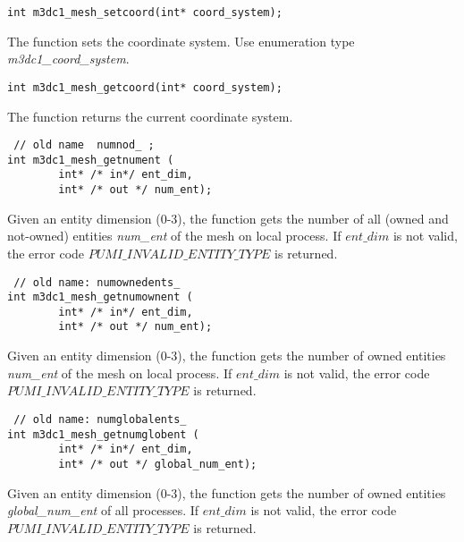 \begin{verbatim}
int m3dc1_mesh_setcoord(int* coord_system);
\end{verbatim}\vspace{-.5cm}\hspace{1cm}

The function sets the coordinate system. Use enumeration type \emph{m3dc1\_coord\_system}.

\begin{verbatim}
int m3dc1_mesh_getcoord(int* coord_system);
\end{verbatim}\vspace{-.5cm}\hspace{1cm}

The function returns the current coordinate system. 


\begin{verbatim}
 // old name  numnod_ ;
int m3dc1_mesh_getnument (
        int* /* in*/ ent_dim, 
        int* /* out */ num_ent);
\end{verbatim}\vspace{-.5cm}\hspace{1cm}

Given an entity dimension (0-3), the function gets the number of all (owned and not-owned) entities \textit{num\_ent} of the mesh on local process.
If $ent\_dim$ is not valid, the error code $PUMI\_INVALID\_ENTITY\_TYPE$ is returned.

\begin{verbatim}
 // old name: numownedents_
int m3dc1_mesh_getnumownent (
        int* /* in*/ ent_dim, 
        int* /* out */ num_ent);
\end{verbatim}\vspace{-.5cm}\hspace{1cm}

Given an entity dimension (0-3), the function gets the number of owned entities \textit{num\_ent} of the mesh on local process.
If $ent\_dim$ is not valid, the error code $PUMI\_INVALID\_ENTITY\_TYPE$ is returned.

\begin{verbatim}
 // old name: numglobalents_
int m3dc1_mesh_getnumglobent (
        int* /* in*/ ent_dim, 
        int* /* out */ global_num_ent);
\end{verbatim}\vspace{-.5cm}\hspace{1cm}

Given an entity dimension (0-3), the function gets the number of owned entities \textit{global\_num\_ent} of all processes.
If $ent\_dim$ is not valid, the error code $PUMI\_INVALID\_ENTITY\_TYPE$ is returned.

